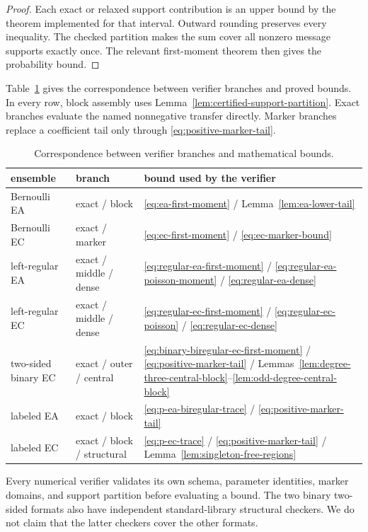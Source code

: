 \begin{proof}
Each exact or relaxed support contribution is an upper bound by the theorem
implemented for that interval.  Outward rounding preserves every inequality.
The checked partition makes the sum cover all nonzero message supports
exactly once.  The relevant first-moment theorem then gives the probability
bound.
\end{proof}

Table~\ref{tab:verifier-correspondence} gives the correspondence between
verifier branches and proved bounds.  In every row, block assembly uses
Lemma~\ref{lem:certified-support-partition}.  Exact branches evaluate the
named nonnegative transfer directly.  Marker branches replace a coefficient
tail only through \eqref{eq:positive-marker-tail}.

\begin{table}[t]
\centering
\small
\caption{Correspondence between verifier branches and mathematical bounds.}
\label{tab:verifier-correspondence}
\begin{tabular}{@{}lll@{}}
\toprule
ensemble & branch & bound used by the verifier \\
\midrule
Bernoulli EA & exact / block
 & \eqref{eq:ea-first-moment} / Lemma~\ref{lem:ea-lower-tail} \\
Bernoulli EC & exact / marker
 & \eqref{eq:ec-first-moment} / \eqref{eq:ec-marker-bound} \\
left-regular EA & exact / middle / dense
 & \eqref{eq:regular-ea-first-moment} / \eqref{eq:regular-ea-poisson-moment} /
   \eqref{eq:regular-ea-dense} \\
left-regular EC & exact / middle / dense
 & \eqref{eq:regular-ec-first-moment} / \eqref{eq:regular-ec-poisson} /
   \eqref{eq:regular-ec-dense} \\
two-sided binary EC & exact / outer / central
 & \eqref{eq:binary-biregular-ec-first-moment} /
   \eqref{eq:positive-marker-tail} /
   Lemmas~\ref{lem:degree-three-central-block}--\ref{lem:odd-degree-central-block} \\
labeled EA & exact / block
 & \eqref{eq:p-ea-biregular-trace} / \eqref{eq:positive-marker-tail} \\
labeled EC & exact / block / structural
 & \eqref{eq:p-ec-trace} / \eqref{eq:positive-marker-tail} /
   Lemma~\ref{lem:singleton-free-regions} \\
\bottomrule
\end{tabular}
\end{table}

Every numerical verifier validates its own schema, parameter identities,
marker domains, and support partition before evaluating a bound.  The two
binary two-sided formats also have independent standard-library structural
checkers.  We do not claim that the latter checkers cover the other formats.

